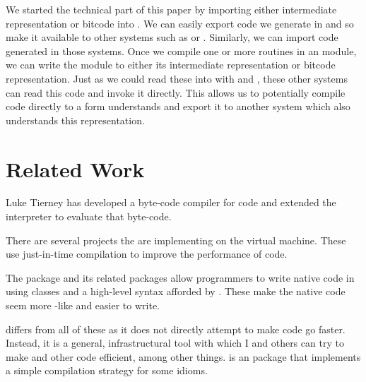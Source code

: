 \documentclass[article]{jss}
\def\Rllvm{\Rpkg{Rllvm}}
\def\IR{intermediate representation}
\begin{document}
We started the technical part of this paper by importing either \IR{}
or bitcode into \R.  We can easily
export \llvm{} code we generate in \R{} and so make it available to other
systems such as \Python{} or \Matlab. Similarly, we can import \llvm{}
code generated in those systems. Once we compile one or more routines
in an \llvm{} module, we can write the module to either its \IR{} or
bitcode representation.  Just as we could read these into \R{} with
 and , these other systems can read
this code and invoke it directly.  This allows us to potentially
compile \R{} code directly to a form \llvm{} understands and export it
to another system which also understands this \llvm{} representation.


\section{Related Work}
Luke Tierney has developed a byte-code compiler for \R{} code
and extended the \R{} interpreter to evaluate that byte-code.

There are several projects the are implementing \R{} on the \Java{}
virtual machine.  These use just-in-time compilation to improve the
performance of code.

The  package and its related packages allow \R{}
programmers to write native code in \Cpp{} using classes and a
high-level syntax afforded by \Cpp{}.  These make the native code seem
more \R{}-like and easier to write.

\Rllvm{} differs from all of these as it does not directly attempt to
make \R{} code go faster. Instead, it is a general, infrastructural
tool with which I and others can try to make \R{} and other code
efficient, among other things.  is an \R{} package
that implements a simple compilation strategy for some \R{} idioms.
\end{document}
